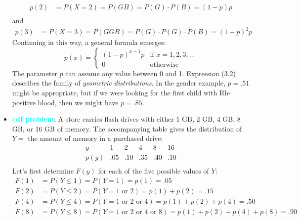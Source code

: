 \documentclass{report}
\begin{document}
\begin{itemize}
\[\begin{aligned}
                    p(2) &= P(X = 2) = P(GB) = P(G) \cdot P(B) = (1 - p)p \\
                \end{aligned}
            \]
            and
            \[
                \begin{aligned}
                    p(3) &= P(X = 3) = P(GGB) = P(G) \cdot P(G) \cdot P(B) = (1 - p)^2 p
                \end{aligned}
            \]
            Continuing in this way, a general formula emerges:
            \[
                p(x) = 
                \begin{cases} 
                    (1 - p)^{x-1} p & \text{if } x = 1, 2, 3, \ldots \\
                    0 & \text{otherwise}
                \end{cases}
            \]
            The parameter \( p \) can assume any value between 0 and 1. Expression (3.2) describes the family of \textit{geometric distributions}. In the gender example, \( p = .51 \) might be appropriate, but if we were looking for the first child with Rh-positive blood, then we might have \( p = .85 \).
        \item \textbf{\textcolor{cyan}{cdf problem}}:
            A store carries flash drives with either 1 GB, 2 GB, 4 GB, 8 GB, or 16 GB of memory. The accompanying table gives the distribution of \( Y = \) the amount of memory in a purchased drive:
            \[
                \begin{array}{c|ccccc}
                    y & 1 & 2 & 4 & 8 & 16 \\
                    \hline
                    p(y) & .05 & .10 & .35 & .40 & .10 \\
                \end{array}
            \]
            Let's first determine \( F(y) \) for each of the five possible values of \( Y \):
            \[
                \begin{aligned}
                    F(1) &= P(Y \leq 1) = P(Y = 1) = p(1) = .05 \\
                    F(2) &= P(Y \leq 2) = P(Y = 1 \text{ or } 2) = p(1) + p(2) = .15 \\
                    F(4) &= P(Y \leq 4) = P(Y = 1 \text{ or } 2 \text{ or } 4) = p(1) + p(2) + p(4) = .50 \\
                    F(8) &= P(Y \leq 8) = P(Y = 1 \text{ or } 2 \text{ or } 4 \text{ or } 8) = p(1) + p(2) + p(4) + p(8) = .90 \\

\end{aligned}\]
\end{itemize}
\end{document}
